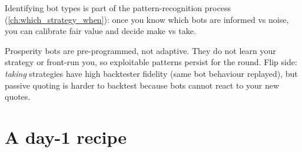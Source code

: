 Identifying bot types is part of the pattern-recognition process
(\cref{ch:which_strategy_when}): once you know which bots are informed
vs noise, you can calibrate fair value and decide make vs take.

\begin{pitfallbox}
Prosperity bots are pre-programmed, not adaptive.  They do not learn
your strategy or front-run you, so exploitable patterns persist for the
round.  Flip side: \emph{taking} strategies have high backtester
fidelity (same bot behaviour replayed), but passive quoting is harder
to backtest because bots cannot react to your new quotes.
\end{pitfallbox}

\section{A day-1 recipe}
\label{sec:day1_recipe}

